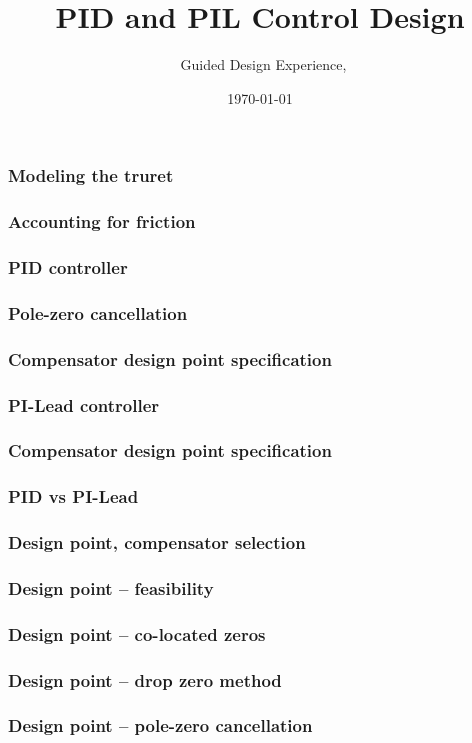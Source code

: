 \documentclass[aspectratio=169]{beamer}
\title{PID and PIL Control Design}
\subtitle{\usnaCourseNumber\ Guided Design Experience, \usnaCourseTerm}
\author{\usnaInstructorShort}
\date{\today}
\begin{document}
\settitlebg
\begin{frame}
\titlepage
\end{frame}

\setslidebg
\begin{frame}
\frametitle{Modeling the truret}
\end{frame}

\begin{frame}
\frametitle{Accounting for friction}
\end{frame}

\begin{frame}
\frametitle{PID controller}
\end{frame}

\begin{frame}
\frametitle{Pole-zero cancellation}
\end{frame}

\begin{frame}
\frametitle{Compensator design point specification}
\end{frame}

\begin{frame}
\frametitle{PI-Lead controller}
\end{frame}

\begin{frame}
\frametitle{Compensator design point specification}
\end{frame}

\begin{frame}
\frametitle{PID vs PI-Lead}
\end{frame}

\begin{frame}
\frametitle{Design point, compensator selection}
\end{frame}

\begin{frame}
\frametitle{Design point -- feasibility}
\end{frame}

\begin{frame}
\frametitle{Design point -- co-located zeros}
\end{frame}

\begin{frame}
\frametitle{Design point -- drop zero method}
\end{frame}

\begin{frame}
\frametitle{Design point -- pole-zero cancellation}
\end{frame}
\end{document}
